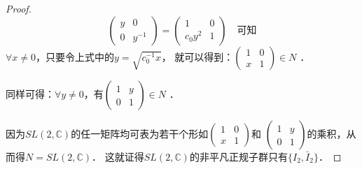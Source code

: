 \begin{proof}
\begin{equation*}
        \begin{pmatrix}  y & 0 \\ 0 & y^{-1}  \end{pmatrix}
        = \begin{pmatrix}  1 & 0 \\ c_0 y^2 & 1 \end{pmatrix} \quad \text{可知}
    \end{equation*}
    $\forall x \neq 0$，只要令上式中的$y=\sqrt{c_0^{-1} x}$，
    就可以得到：$\left(\begin{smallmatrix} 1 & 0 \\ x & 1\end{smallmatrix}\right) \in N$ ．
    
    同样可得：$\forall y \neq 0$，有$\left(\begin{smallmatrix} 1 & y \\ 0 & 1\end{smallmatrix}\right) \in N$ ．
    
    因为$SL(2,\mathbb{C})$的任一矩阵均可表为若干个形如$\left(\begin{smallmatrix} 1 & 0 \\ x & 1\end{smallmatrix}\right)$和
    $\left(\begin{smallmatrix} 1 & y \\ 0 & 1\end{smallmatrix}\right)$的乘积，从而得$N=SL(2,\mathbb{C})$．
    这就证得$SL(2,\mathbb{C})$的非平凡正规子群只有$\{I_2,\bar{I}_2\}$． 
\end{proof}


